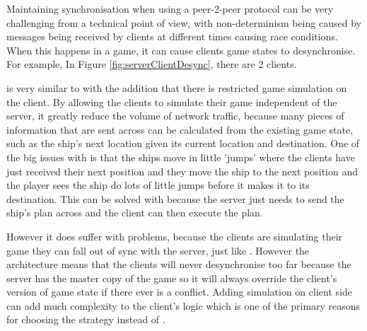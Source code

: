 Maintaining synchronisation when using a peer-2-peer protocol can be very challenging from a technical point of view, with non-determinism being caused by messages being received by clients at different times causing race conditions.
When this happens in a game, it can cause clients game states to desynchronise.
For example, In Figure \ref{fig:serverClientDesync}, there are 2 clients.


\emph{\stepThreeName} is very similar to \stepTwoName with the addition that there is restricted game simulation on the client.
By allowing the clients to simulate their game independent of the server, it greatly reduce the volume of network traffic, because many pieces of information that are sent across can be calculated from the existing game state, such as the ship's next location given its current location and destination.
One of the big issues with \stepTwoName is that the ships move in little 'jumps' where the clients have just received their next position and they move the ship to the next position and the player sees the ship do lots of little jumps before it makes it to its destination. This can be solved with \stepThreeName because the server just needs to send the ship's plan across and the client can then execute the plan.

However it does suffer with problems, because the clients are simulating their game they can fall out of sync with the server, just like \stepOneName. However the architecture means that the clients will never desynchronise too far because the server has the master copy of the game so it will always override the client's version of game state if there ever is a conflict. 
Adding simulation on client side can add much complexity to the client's logic which is one of the primary reasons for choosing the \stepTwoName strategy instead of \stepThreeName.


